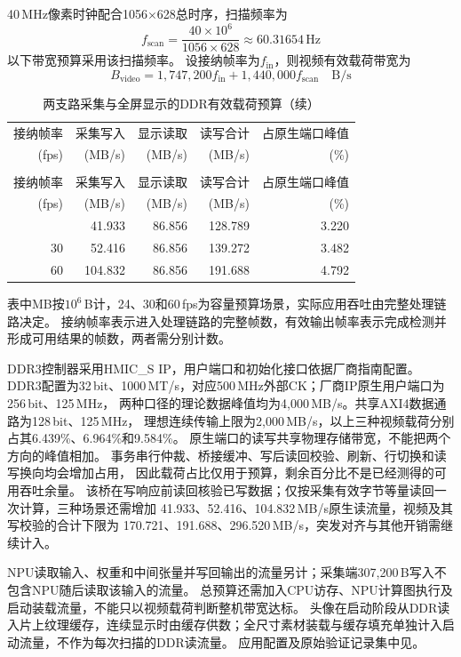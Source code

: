 40\,MHz像素时钟配合1056$\times$628总时序，扫描频率为
\[
f_{\mathrm{scan}}=\frac{40\times10^6}{1056\times628}\approx60.31654\,\mathrm{Hz}
\]
以下带宽预算采用该扫描频率。
设接纳帧率为$f_{\mathrm{in}}$，则视频有效载荷带宽为
\[
B_{\mathrm{video}}=1{,}747{,}200f_{\mathrm{in}}+1{,}440{,}000f_{\mathrm{scan}}\quad\mathrm{B/s}
\]

\begin{reporttable}
\footnotesize
\begin{longtable}{@{}rrrrr@{}}
\caption{两支路采集与全屏显示的DDR有效载荷预算}\\
\toprule
接纳帧率 & 采集写入 & 显示读取 & 读写合计 & 占原生端口峰值 \\
(fps) & (MB/s) & (MB/s) & (MB/s) & (\%) \\
\midrule
\endfirsthead
\caption[]{两支路采集与全屏显示的DDR有效载荷预算（续）}\\
\toprule
接纳帧率 & 采集写入 & 显示读取 & 读写合计 & 占原生端口峰值 \\
(fps) & (MB/s) & (MB/s) & (MB/s) & (\%) \\
\midrule
\endhead
\bottomrule
\endfoot
24 & 41.933 & 86.856 & 128.789 & 3.220 \\
30 & 52.416 & 86.856 & 139.272 & 3.482 \\
60 & 104.832 & 86.856 & 191.688 & 4.792 \\
\end{longtable}
\end{reporttable}

表中MB按$10^6$\,B计，24、30和60\,fps为容量预算场景，实际应用吞吐由完整处理链路决定。
接纳帧率表示进入处理链路的完整帧数，有效输出帧率表示完成检测并形成可用结果的帧数，两者需分别计数。

DDR3控制器采用HMIC\_S IP，用户端口和初始化接口依据厂商指南配置。
DDR3配置为32\,bit、1000\,MT/s，对应500\,MHz外部CK；厂商IP原生用户端口为256\,bit、125\,MHz，
两种口径的理论数据峰值均为4,000\,MB/s。共享AXI4数据通路为128\,bit、125\,MHz，
理想连续传输上限为2,000\,MB/s，以上三种视频载荷分别占其6.439\%、6.964\%和9.584\%。
原生端口的读写共享物理存储带宽，不能把两个方向的峰值相加。
事务串行仲裁、桥接缓冲、写后读回校验、刷新、行切换和读写换向均会增加占用，
因此载荷占比仅用于预算，剩余百分比不是已经测得的可用吞吐余量。
该桥在写响应前读回核验已写数据；仅按采集有效字节等量读回一次计算，三种场景还需增加
41.933、52.416、104.832\,MB/s原生读流量，视频及其写校验的合计下限为
170.721、191.688、296.520\,MB/s，突发对齐与其他开销需继续计入。

NPU读取输入、权重和中间张量并写回输出的流量另计；采集端307,200\,B写入不包含NPU随后读取该输入的流量。
总预算还需加入CPU访存、NPU计算图执行及启动装载流量，不能只以视频载荷判断整机带宽达标。
头像在启动阶段从DDR读入片上纹理缓存，连续显示时由缓存供数；全尺寸素材装载与缓存填充单独计入启动流量，不作为每次扫描的DDR读流量。
应用配置及原始验证记录集中见。

